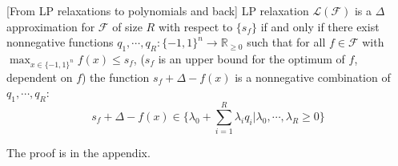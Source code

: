 \begin{theorem}\label{theorem_polytope_polynomials}[From LP relaxations to polynomials and back]  LP relaxation $\mathcal{L}(\mathcal{F})$ is a $\Delta$ approximation for $\mathcal{F}$ of size $R$ with respect to $\{s_f\}$ if and only if there exist nonnegative functions $q_1, \cdots, q_R : \{-1,1\}^n \rightarrow \mathbb{R}_{\geq 0}$ such that for all $f \in \mathcal{F}$ with $\max_{x \in \{-1,1\}^n} f(x) \leq s_f$, ($s_f$ is an upper bound for the optimum of $f$, dependent on $f$) the function $s_f + \Delta -f(x)$ is a nonnegative combination of $q_1, \cdots, q_R$:
\begin{equation}
s_f + \Delta - f(x) \in \{\lambda_0 + \sum_{i=1}^R \lambda_i q_i  | \lambda_0, \cdots, \lambda_R \geq 0 \}
\end{equation}

\end{theorem}

The proof is in the appendix.


